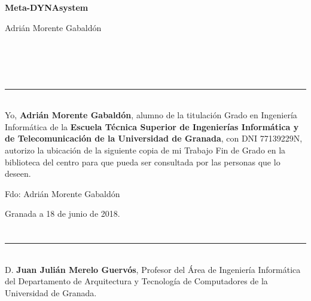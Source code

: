 \cleardoublepage
\thispagestyle{empty}

\begin{center}
	{\large\bfseries Meta-DYNAsystem}\\
\end{center}
\begin{center}
	Adrián Morente Gabaldón\\
\end{center}

\\

\vspace{0.7cm}
\\



\chapter*{}
\thispagestyle{empty}

\noindent\rule[-1ex]{\textwidth}{2pt}\\[4.5ex]

Yo, \textbf{Adrián Morente Gabaldón}, alumno de la titulación Grado en Ingeniería Informática de la \textbf{Escuela Técnica Superior
de Ingenierías Informática y de Telecomunicación de la Universidad de Granada}, con DNI 77139229N, autorizo la
ubicación de la siguiente copia de mi Trabajo Fin de Grado en la biblioteca del centro para que pueda ser
consultada por las personas que lo deseen.

\vspace{6cm}

\noindent Fdo: Adrián Morente Gabaldón

\vspace{2cm}

\begin{flushright}
Granada a 18 de junio de 2018.
\end{flushright}


\chapter*{}
\thispagestyle{empty}

\noindent\rule[-1ex]{\textwidth}{2pt}\\[4.5ex]

D. \textbf{Juan Julián Merelo Guervós}, Profesor del Área de Ingeniería Informática del Departamento de Arquitectura y Tecnología de Computadores de la Universidad de Granada.

